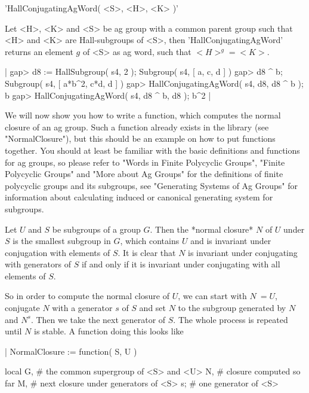 
'HallConjugatingAgWord( <S>, <H>, <K> )'

Let <H>, <K> and <S> be ag group with a common parent group such that <H>
and <K> are  Hall-subgroups of <S>, then 'HallConjugatingAgWord'  returns
an element $g$ of <S> as ag word, such that $<H>^g = <K>$.

|    gap> d8 := HallSubgroup( s4, 2 );
    Subgroup( s4, [ a, c, d ] )
    gap> d8 ^ b;
    Subgroup( s4, [ a*b^2, c*d, d ] )
    gap> HallConjugatingAgWord( s4, d8, d8 ^ b );
    b
    gap> HallConjugatingAgWord( s4, d8 ^ b, d8 );
    b^2 |




We will now show you how to write a  {\GAP} function,  which computes the
normal closure  of  an ag group.   Such  a function already exists in the
library  (see  "NormalClosure"), but this should be  an example on how to
put functions  together.  You should at least  be familiar with the basic
definitions and functions  for ag groups,  so please  refer  to "Words in
Finite Polycyclic Groups", "Finite Polycyclic Groups" and  "More about Ag
Groups"   for the  definitions    of  finite polycyclic  groups  and  its
subgroups, see "Generating  Systems  of  Ag Groups" for information about
calculating induced or canonical generating system for subgroups.

Let  $U$  and $S$ be subgroups of a group $G$.  Then the *normal closure*
$N$ of $U$ under $S$ is the smallest subgroup in $G$,  which contains $U$
and  is  invariant  under  conjugation with elements of $S$.  It is clear
that  $N$  is  invariant  under conjugating with generators of $S$ if and
only if it is invariant under conjugating with all elements of $S$.

So in order to compute the normal closure of $U$, we can start with $N\:=
U$, conjugate $N$ with a generator $s$ of $S$ and set $N$ to the subgroup
generated by $N$ and $N^s$.  Then we take the next generator of $S$.  The
whole process  is repeated until $N$ is  stable.  A {\GAP} function doing
this looks like

|    NormalClosure := function( S, U )

        local   G,  #  the common supergroup of <S> and <U>
                N,  #  closure computed so far
                M,  #  next closure under generators of <S>
                s;  #  one generator of <S>

